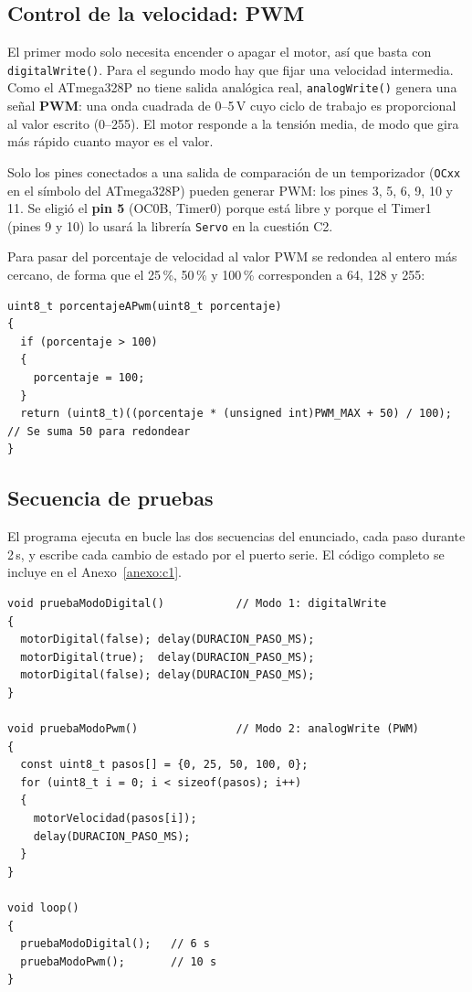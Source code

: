 \documentclass{upo-master}
\begin{document}

\subsection{Control de la velocidad: PWM}

El primer modo solo necesita encender o apagar el motor, así que basta con
\texttt{digitalWrite()}. Para el segundo modo hay que fijar una velocidad
intermedia. Como el ATmega328P no tiene salida analógica real,
\texttt{analogWrite()} genera una señal \textbf{PWM}: una onda cuadrada de
0--5\,V cuyo ciclo de trabajo es proporcional al valor escrito (0--255). El
motor responde a la tensión media, de modo que gira más rápido cuanto mayor es
el valor.

Solo los pines conectados a una salida de comparación de un temporizador
(\texttt{OCxx} en el símbolo del ATmega328P) pueden generar PWM: los
pines 3, 5, 6, 9, 10 y 11. Se eligió el \textbf{pin 5} (OC0B, Timer0) porque
está libre y porque el Timer1 (pines 9 y 10) lo usará la librería
\texttt{Servo} en la cuestión C2.

Para pasar del porcentaje de velocidad al valor PWM se redondea al entero más
cercano, de forma que el 25\,\%, 50\,\% y 100\,\% corresponden a 64, 128 y 255:

\begin{lstlisting}[style=arduino, caption={Conversión de porcentaje a valor PWM.}]
uint8_t porcentajeAPwm(uint8_t porcentaje)
{
  if (porcentaje > 100)
  {
    porcentaje = 100;
  }
  return (uint8_t)((porcentaje * (unsigned int)PWM_MAX + 50) / 100); // Se suma 50 para redondear
}
\end{lstlisting}

\subsection{Secuencia de pruebas}

El programa ejecuta en bucle las dos secuencias del enunciado, cada paso
durante 2\,s, y escribe cada cambio de estado por el puerto serie. El código
completo se incluye en el Anexo~\ref{anexo:c1}.

\begin{lstlisting}[style=arduino, caption={Secuencias de prueba de los dos modos.}]
void pruebaModoDigital()           // Modo 1: digitalWrite
{
  motorDigital(false); delay(DURACION_PASO_MS);
  motorDigital(true);  delay(DURACION_PASO_MS);
  motorDigital(false); delay(DURACION_PASO_MS);
}

void pruebaModoPwm()               // Modo 2: analogWrite (PWM)
{
  const uint8_t pasos[] = {0, 25, 50, 100, 0};
  for (uint8_t i = 0; i < sizeof(pasos); i++)
  {
    motorVelocidad(pasos[i]);
    delay(DURACION_PASO_MS);
  }
}

void loop()
{
  pruebaModoDigital();   // 6 s
  pruebaModoPwm();       // 10 s
}
\end{lstlisting}
\end{document}
